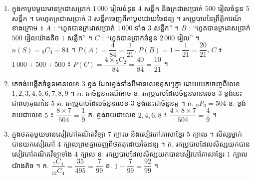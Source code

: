 \begin{enumerate}[1]
  \item ក្នុងកាបូបមួយមានក្រដាសប្រាក់ $1\,000$ រៀលចំនួន $4$ សន្លឹក និងក្រដាសប្រាក់ $500$ រៀលចំនួន $5$ សន្លឹក ។ គេហូតក្រដាសប្រាក់ $3$ សន្លឹកចេញពីកាបូបដោយចៃដន្យ ។ រកប្រូបាបនៃព្រឹត្តិការណ៍ខាងក្រោម ៖ $A$ : “ហូតបានក្រដាសប្រាក់ $1\,000$ ទាំង $3$ សន្លឹក” ។ $B$ : “ហូតបានក្រដាសប្រាក់ $500$ រៀលយ៉ាងតិច $1$ សន្លឹក” ។ $C$ : “ហូតបានប្រាក់ចំនួន $2\,000$ រៀល” ។
  \ans
  $n(S) = {}_9C_3 = 84$ ។ $P(A) = \dfrac{4}{84} = \dfrac{1}{21}$, $P(B) = 1 - \dfrac{1}{21} = \dfrac{20}{21}$, $C$ ៖ $1\,000 + 500 + 500$ ៖ $P(C) = \dfrac{4\times{}_5C_2}{84} = \dfrac{40}{84} = \dfrac{10}{21}$ ។
  \item គេចង់បង្កើតចំនួនមានលេខ $3$ ខ្ទង់ ដែលខ្ទង់ទាំងបីមានលេខខុសៗគ្នា ដោយយកចេញពីលេខ $1, 2, 3, 4, 5, 6, 7, 8, 9$ ។ \quad ក. រកចំនួនករណីអាច \quad ខ. រកប្រូបាបដែលចំនួនមានលេខ $3$ ខ្ទង់នេះជាពហុគុណនៃ $5$ \quad គ. រកប្រូបាបដែលចំនួនលេខ $3$ ខ្ទង់នេះជាចំនួនគូ ។
  \ans
  ក. ${}_9P_3 = 504$ \quad ខ. ខ្ទង់រាយជាលេខ $5$ ៖ $\dfrac{8\times 7}{504} = \dfrac{1}{9}$ \quad គ. ខ្ទង់រាយជាលេខ $2, 4, 6, 8$ ៖ $\dfrac{4\times 8\times 7}{504} = \dfrac{4}{9}$ ។
  \item ក្នុងថតតុមួយមានសៀវភៅគណិតវិទ្យា $7$ ក្បាល និងសៀវភៅភាសាខ្មែរ $5$ ក្បាល ។ សិស្សម្នាក់បានយកសៀវភៅ $4$ ក្បាលព្រមគ្នាចេញពីថតតុដោយចៃដន្យ ។ \quad ក. រកប្រូបាបដែលសិស្សយកបានសៀវភៅគណិតវិទ្យាទាំង $4$ ក្បាល \quad ខ. រកប្រូបាបដែលសិស្សយកបានសៀវភៅភាសាខ្មែរ $1$ ក្បាលយ៉ាងតិច ។
  \ans
  ក. $\dfrac{{}_7C_4}{{}_{12}C_4} = \dfrac{35}{495} = \dfrac{7}{99}$ \quad ខ. $1 - \dfrac{7}{99} = \dfrac{92}{99}$ ។
\end{enumerate}
